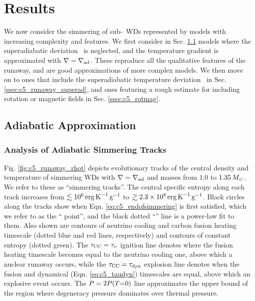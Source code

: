 \section{Results}
\label{sec:c5_results}

We now consider the simmering of sub-\Mch\ WDs represented by models with increasing complexity and features.  We first consider in Sec. \ref{ssec:c5_runaway_ad} models where the superadiabatic deviation \dnabconv\ is neglected, and the temperature gradient is approximated with $\nabla = \nablaad$. These reproduce all the qualitative features of the runaway, and are good approximations of more complex models.  We then move on to ones that include the superadiabatic temperature deviation \dnabconv\ in Sec. \ref{ssec:c5_runaway_superad}, and ones featuring a rough estimate for including rotation or magnetic fields in Sec. \ref{ssec:c5_rotmag}.

\subsection{Adiabatic Approximation}
\label{ssec:c5_runaway_ad}

\subsubsection{Analysis of Adiabatic Simmering Tracks}
\label{ssec:c5_runaway_ad_analysis}

Fig. \ref{fig:c5_runaway_rhot} depicts evolutionary tracks of the central density and temperature of simmering WDs with $\nabla = \nablaad$ and masses from $1.0$ to $1.35\,\Msun$.  We refer to these as ``simmering tracks''.  The central specific entropy along each track increases from $\lesssim10^6\,\ergpKg$ to $\gtrsim2.3\times10^8\,\ergpKg$.  Black circles along the tracks show when Eqn. \ref{eq:c5_endofsimmering} is first satisfied, which we refer to as the ``\citeal{wooswk04} point'', and the black dotted ``\citeal{wooswk04}'' line is a power-law fit to them.  Also shown are contours of neutrino cooling and carbon fusion heating timescale (dotted blue and red lines, respectively) and contours of constant entropy (dotted green).  The $\taucc = \taunu$ ignition line denotes where the fusion heating timescale becomes equal to the neutrino cooling one, above which a nuclear runaway occurs, while the $\taucc = \taudyn$ explosion line denotes when the fusion and dynamical (Eqn. \ref{eq:c5_taudyn}) timescales are equal, above which an explosive event occurs.  The $P = 2P(T\mathrm{=}0)$ line approximates the upper bound of the region where degeneracy pressure dominates over thermal pressure.

